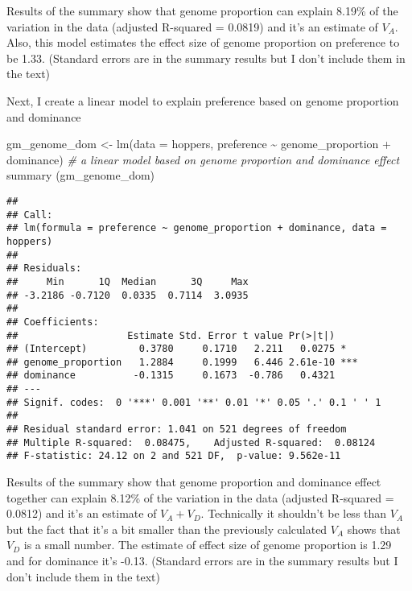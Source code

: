 \documentclass[
]{article}
\newenvironment{Shaded}{\begin{snugshade}}{\end{snugshade}}
\newcommand{\AttributeTok}[1]{\textcolor[rgb]{0.77,0.63,0.00}{#1}}
\newcommand{\CommentTok}[1]{\textcolor[rgb]{0.56,0.35,0.01}{\textit{#1}}}
\newcommand{\FunctionTok}[1]{\textcolor[rgb]{0.00,0.00,0.00}{#1}}
\newcommand{\NormalTok}[1]{#1}
\newcommand{\OtherTok}[1]{\textcolor[rgb]{0.56,0.35,0.01}{#1}}
\newcommand{\SpecialCharTok}[1]{\textcolor[rgb]{0.00,0.00,0.00}{#1}}
\begin{document}
Results of the summary show that genome proportion can explain 8.19\% of
the variation in the data (adjusted R-squared = 0.0819) and it's an
estimate of \(V_A\). Also, this model estimates the effect size of
genome proportion on preference to be 1.33. (Standard errors are in the
summary results but I don't include them in the text)

Next, I create a linear model to explain preference based on genome
proportion and dominance

\begin{Shaded}
\begin{Highlighting}[]
\NormalTok{gm\_genome\_dom }\OtherTok{\textless{}{-}} \FunctionTok{lm}\NormalTok{(}\AttributeTok{data =}\NormalTok{ hoppers, preference }\SpecialCharTok{\textasciitilde{}}\NormalTok{ genome\_proportion }\SpecialCharTok{+}\NormalTok{ dominance) }\CommentTok{\# a linear model based on genome proportion and dominance effect}
\FunctionTok{summary}\NormalTok{ (gm\_genome\_dom)}
\end{Highlighting}
\end{Shaded}

\begin{verbatim}
## 
## Call:
## lm(formula = preference ~ genome_proportion + dominance, data = hoppers)
## 
## Residuals:
##     Min      1Q  Median      3Q     Max 
## -3.2186 -0.7120  0.0335  0.7114  3.0935 
## 
## Coefficients:
##                   Estimate Std. Error t value Pr(>|t|)    
## (Intercept)         0.3780     0.1710   2.211   0.0275 *  
## genome_proportion   1.2884     0.1999   6.446 2.61e-10 ***
## dominance          -0.1315     0.1673  -0.786   0.4321    
## ---
## Signif. codes:  0 '***' 0.001 '**' 0.01 '*' 0.05 '.' 0.1 ' ' 1
## 
## Residual standard error: 1.041 on 521 degrees of freedom
## Multiple R-squared:  0.08475,    Adjusted R-squared:  0.08124 
## F-statistic: 24.12 on 2 and 521 DF,  p-value: 9.562e-11
\end{verbatim}

Results of the summary show that genome proportion and dominance effect
together can explain 8.12\% of the variation in the data (adjusted
R-squared = 0.0812) and it's an estimate of \(V_A + V_D\). Technically
it shouldn't be less than \(V_A\) but the fact that it's a bit smaller
than the previously calculated \(V_A\) shows that \(V_D\) is a small
number. The estimate of effect size of genome proportion is 1.29 and for
dominance it's -0.13. (Standard errors are in the summary results but I
don't include them in the text)
\end{document}
